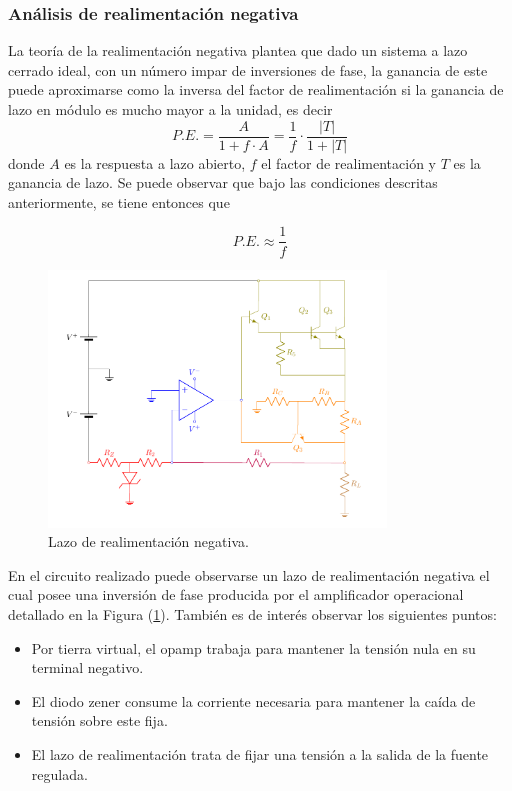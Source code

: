  


\subsubsection{Análisis de realimentación negativa}
\label{sec:realimentacion-negativa}

La teoría de la realimentación negativa plantea que dado un sistema a lazo cerrado ideal, con un número impar de inversiones de fase, la ganancia de este puede aproximarse como la inversa del factor de realimentación si la ganancia de lazo en módulo es mucho mayor a la unidad, es decir
\begin{equation}
P.E. = \frac{A }{1+ f \cdot A} = \frac{1}{f} \cdot \frac{|T|}{1 + |T|}
\end{equation}
donde $A$ es la respuesta a lazo abierto, $f$ el factor de realimentación y $T$ es la ganancia de lazo. Se puede observar que bajo las condiciones descritas anteriormente, se tiene entonces que 

\begin{equation}
P.E. \approx \frac{1}{f}
\end{equation}

\begin{figure}[H]
\centering
	\includegraphics[width=0.8\textwidth, page=4]{ImagenesEjercicio2/Regulador.pdf}
	\caption{Lazo de realimentación negativa.}
	\label{fig:circuito_lazo}
\end{figure}

En el circuito realizado puede observarse un lazo de realimentación negativa el cual posee una inversión de fase producida por el amplificador operacional detallado en la Figura (\ref{fig:circuito_lazo}). También es de interés observar los siguientes puntos: 
\begin{itemize}
\item Por tierra virtual, el opamp trabaja para mantener la tensión nula en su terminal negativo.
\item El diodo zener consume la corriente necesaria para mantener la caída de tensión sobre este fija.
\item El lazo de realimentación trata de fijar una tensión a la salida de la fuente regulada.
\end{itemize}

